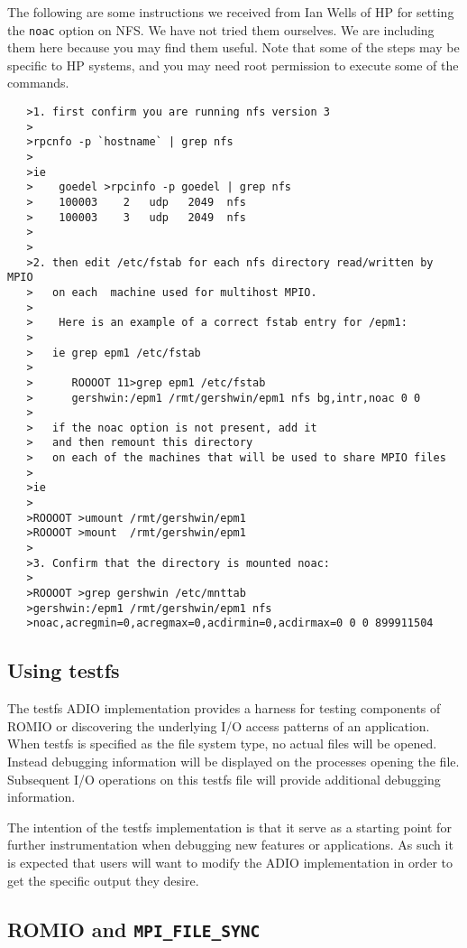 The following are some instructions we received from Ian Wells of HP
for setting the {\tt noac} option on NFS. We have not tried them
ourselves. We are including them here because you may find 
them useful. Note that some of the steps may be specific to HP
systems, and you may need root permission to execute some of the
commands. 

\begin{verbatim}   
   >1. first confirm you are running nfs version 3
   >
   >rpcnfo -p `hostname` | grep nfs
   >
   >ie 
   >    goedel >rpcinfo -p goedel | grep nfs
   >    100003    2   udp   2049  nfs
   >    100003    3   udp   2049  nfs
   >
   >
   >2. then edit /etc/fstab for each nfs directory read/written by MPIO
   >   on each  machine used for multihost MPIO.
   >
   >    Here is an example of a correct fstab entry for /epm1:
   >
   >   ie grep epm1 /etc/fstab
   > 
   >      ROOOOT 11>grep epm1 /etc/fstab
   >      gershwin:/epm1 /rmt/gershwin/epm1 nfs bg,intr,noac 0 0
   >
   >   if the noac option is not present, add it 
   >   and then remount this directory
   >   on each of the machines that will be used to share MPIO files
   >
   >ie
   >
   >ROOOOT >umount /rmt/gershwin/epm1
   >ROOOOT >mount  /rmt/gershwin/epm1
   >
   >3. Confirm that the directory is mounted noac:
   >
   >ROOOOT >grep gershwin /etc/mnttab 
   >gershwin:/epm1 /rmt/gershwin/epm1 nfs
   >noac,acregmin=0,acregmax=0,acdirmin=0,acdirmax=0 0 0 899911504
\end{verbatim}

\subsection{Using testfs}
The testfs ADIO implementation provides a harness for testing components
of ROMIO or discovering the underlying I/O access patterns of an
application.  When testfs is specified as the file system type, no
actual files will be opened.  Instead debugging information will be
displayed on the processes opening the file.  Subsequent I/O operations
on this testfs file will provide additional debugging information.

The intention of the testfs implementation is that it serve as a
starting point for further instrumentation when debugging new features
or applications.  As such it is expected that users will want to modify
the ADIO implementation in order to get the specific output they desire.

\subsection{ROMIO and {\tt MPI\_FILE\_SYNC}}

